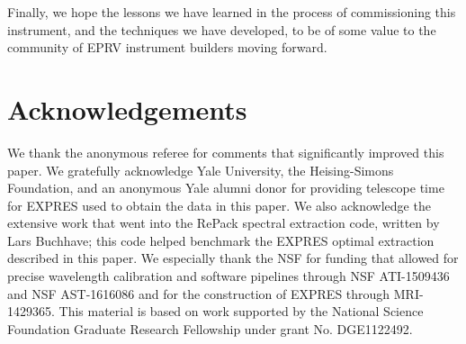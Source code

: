 Finally, we hope the lessons we have learned in the process of commissioning this instrument, and the techniques we have developed, to be of some value to the community of EPRV instrument builders moving forward.

\section*{Acknowledgements}

We thank the anonymous referee for comments that significantly improved this paper. We gratefully acknowledge Yale University, the Heising-Simons Foundation, and an anonymous Yale alumni donor for providing telescope time for EXPRES used to obtain the data in this paper. We also acknowledge the extensive work that went into the RePack spectral extraction code, written by Lars Buchhave; this code helped benchmark the EXPRES optimal extraction described in this paper. We especially thank the NSF for funding that allowed for precise wavelength calibration and software pipelines through NSF ATI-1509436 and NSF AST-1616086 and for the construction of EXPRES through MRI-1429365. This material is based on work supported by the National Science Foundation Graduate Research Fellowship under grant No. DGE1122492.

